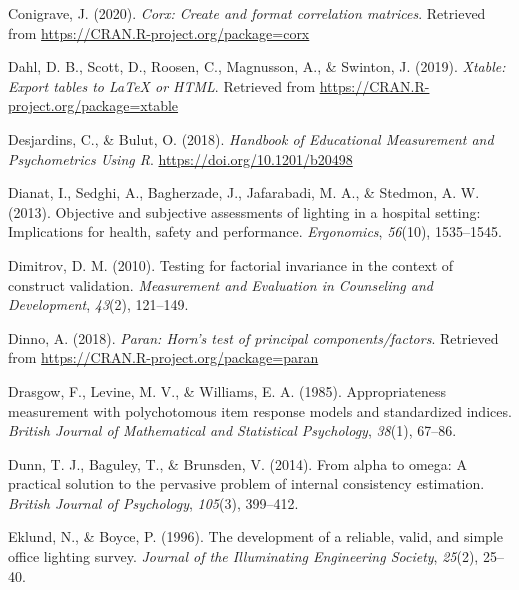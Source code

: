 \documentclass[
  english,
  man]{apa6}
\newlength{\cslhangindent}
\newlength{\cslentryspacingunit} %
\newenvironment{CSLReferences}[2] %
 {%
  \setlength{\parindent}{0pt}
  \ifodd #1
  \let\oldpar\par
  \def\par{\hangindent=\cslhangindent\oldpar}
  \fi
  \setlength{\parskip}{#2\cslentryspacingunit}
 }%
 {}
\begin{document}
\begin{CSLReferences}{1}{0}
\leavevmode{}%
Conigrave, J. (2020). \emph{Corx: Create and format correlation matrices}. Retrieved from \url{https://CRAN.R-project.org/package=corx}

\leavevmode{}%
Dahl, D. B., Scott, D., Roosen, C., Magnusson, A., \& Swinton, J. (2019). \emph{Xtable: Export tables to LaTeX or HTML}. Retrieved from \url{https://CRAN.R-project.org/package=xtable}

\leavevmode{}%
Desjardins, C., \& Bulut, O. (2018). \emph{Handbook of {Educational Measurement} and {Psychometrics Using R}}. \url{https://doi.org/10.1201/b20498}

\leavevmode{}%
Dianat, I., Sedghi, A., Bagherzade, J., Jafarabadi, M. A., \& Stedmon, A. W. (2013). Objective and subjective assessments of lighting in a hospital setting: Implications for health, safety and performance. \emph{Ergonomics}, \emph{56}(10), 1535--1545.

\leavevmode{}%
Dimitrov, D. M. (2010). Testing for factorial invariance in the context of construct validation. \emph{Measurement and Evaluation in Counseling and Development}, \emph{43}(2), 121--149.

\leavevmode{}%
Dinno, A. (2018). \emph{Paran: Horn's test of principal components/factors}. Retrieved from \url{https://CRAN.R-project.org/package=paran}

\leavevmode{}%
Drasgow, F., Levine, M. V., \& Williams, E. A. (1985). Appropriateness measurement with polychotomous item response models and standardized indices. \emph{British Journal of Mathematical and Statistical Psychology}, \emph{38}(1), 67--86.

\leavevmode{}%
Dunn, T. J., Baguley, T., \& Brunsden, V. (2014). From alpha to omega: A practical solution to the pervasive problem of internal consistency estimation. \emph{British Journal of Psychology}, \emph{105}(3), 399--412.

\leavevmode{}%
Eklund, N., \& Boyce, P. (1996). The development of a reliable, valid, and simple office lighting survey. \emph{Journal of the Illuminating Engineering Society}, \emph{25}(2), 25--40.


\end{CSLReferences}
\end{document}
